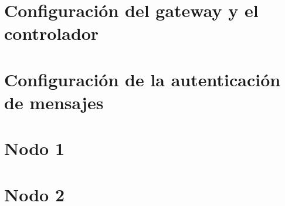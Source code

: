 \graphicspath{{./2/}}

\chapter{Configuración del gateway y el controlador}



\chapter{Configuración de la autenticación de mensajes}



\chapter{Nodo 1}



\chapter{Nodo 2}

